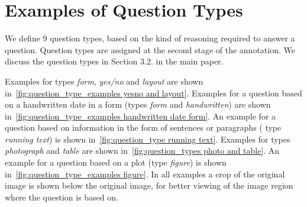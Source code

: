 \documentclass[10pt,twocolumn,letterpaper]{article}
\begin{document}
\section{Examples of Question Types}
\label{appendix:question_types}
We define  9 question types, based on the kind of reasoning required to answer a question.
Question types are assigned at the second stage of the annotation. We discuss the question types in Section 3.2. in the main paper. 

Examples for types \textit{form}, \textit{yes/no} and \textit{layout} are shown in~\autoref{fig:question_type_examples yesno and layout}. Examples for a question based on a handwritten date in a form (types \textit{form} and \textit{handwritten}) are shown in~\autoref{fig:question_type_examples handwritten date form}. An example for a question based on information in the form of sentences or paragraphs ( type \textit{running text}) is shown in~\autoref{fig:question_type running text}. Examples for types \textit{photograph} and \textit{table} are shown in~\autoref{fig:question_types photo and table}. An example for a question based on a plot (type \textit{figure}) is shown in~\autoref{fig:question_type_examples figure}. In all examples a crop of the original image is shown below the original image, for better viewing of the image region where the question is based on.
\end{document}
